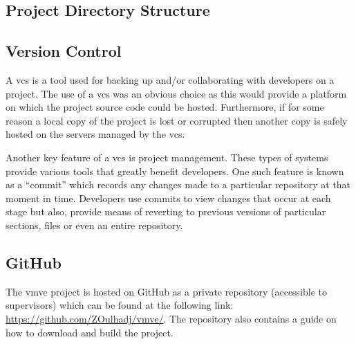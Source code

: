 \documentclass[11pt]{article}
\begin{document}
\subsection{Project Directory Structure} \label{project_directories}



\subsection{Version Control} \label{version_control}
A \gls*{vcs} is a tool used for backing up and/or collaborating with developers
on a project. The use of a \gls*{vcs} was an obvious choice as this would
provide a platform on which the project source code could be hosted.
Furthermore, if for some reason a local copy of the project is lost or corrupted
then another copy is safely hosted on the servers managed by the \gls*{vcs}.

Another key feature of a \gls*{vcs} is project management. These types of
systems provide various tools that greatly benefit developers. One such feature
is known as a ``commit'' which records any changes made to a particular
repository at that moment in time. Developers use commits to view changes that
occur at each stage but also, provide means of reverting to previous versions of
particular sections, files or even an entire repository.


\subsection{GitHub} \label{github}

The \gls*{vmve} project is hosted on GitHub as a private repository (accessible
to supervisors) which can be found at the following link:
\href{https://github.com/ZOulhadj/vmve/}{https://github.com/ZOulhadj/vmve/}. The
repository also contains a guide on how to download and build the project.
\end{document}
